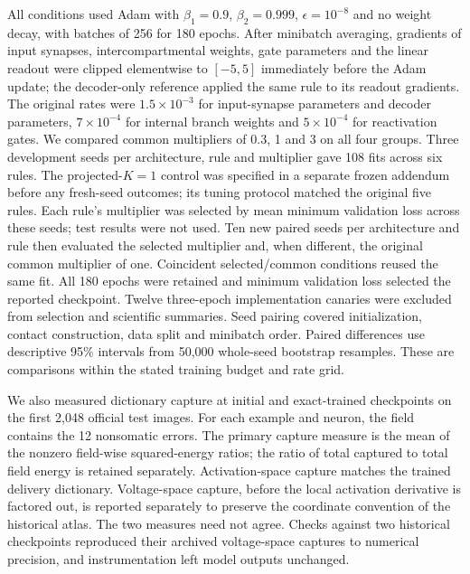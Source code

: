 All conditions used Adam with $\beta_1=0.9$, $\beta_2=0.999$, $\epsilon=10^{-8}$ and no weight decay, with batches of 256 for 180 epochs. After minibatch averaging, gradients of input synapses, intercompartmental weights, gate parameters and the linear readout were clipped elementwise to $[-5,5]$ immediately before the Adam update; the decoder-only reference applied the same rule to its readout gradients. The original rates were $1.5\times10^{-3}$ for input-synapse parameters and decoder parameters, $7\times10^{-4}$ for internal branch weights and $5\times10^{-4}$ for reactivation gates. We compared common multipliers of 0.3, 1 and 3 on all four groups. Three development seeds per architecture, rule and multiplier gave 108 fits across six rules. The projected-$K=1$ control was specified in a separate frozen addendum before any fresh-seed outcomes; its tuning protocol matched the original five rules. Each rule's multiplier was selected by mean minimum validation loss across these seeds; test results were not used. Ten new paired seeds per architecture and rule then evaluated the selected multiplier and, when different, the original common multiplier of one. Coincident selected/common conditions reused the same fit. All 180 epochs were retained and minimum validation loss selected the reported checkpoint. Twelve three-epoch implementation canaries were excluded from selection and scientific summaries. Seed pairing covered initialization, contact construction, data split and minibatch order. Paired differences use descriptive 95\% intervals from 50,000 whole-seed bootstrap resamples. These are comparisons within the stated training budget and rate grid.

We also measured dictionary capture at initial and exact-trained checkpoints on the first 2,048 official test images. For each example and neuron, the field contains the 12 nonsomatic errors. The primary capture measure is the mean of the nonzero field-wise squared-energy ratios; the ratio of total captured to total field energy is retained separately. Activation-space capture matches the trained delivery dictionary. Voltage-space capture, before the local activation derivative is factored out, is reported separately to preserve the coordinate convention of the historical atlas. The two measures need not agree. Checks against two historical checkpoints reproduced their archived voltage-space captures to numerical precision, and instrumentation left model outputs unchanged.
